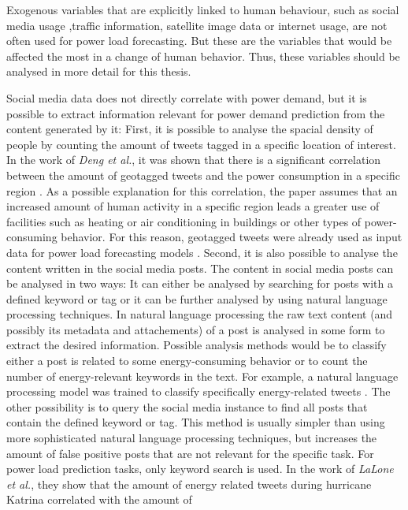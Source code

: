 Exogenous variables that are explicitly linked to human behaviour, 
such as social media usage ,traffic information,  
satellite image data or internet usage, are not often 
used for power load forecasting. 
But these are the variables that would be affected the most in a change of 
human behavior. Thus, these variables should be analysed in more detail 
for this thesis.

Social media data does not directly correlate with power demand, but it is
possible to extract information relevant for power demand prediction
from the content generated by it:
First, it is possible to analyse the spacial density of people by 
counting the amount of tweets tagged in a specific location of interest. 
In the work of \textit{Deng et al.},
it was shown that there is a significant
correlation between the amount of geotagged tweets
and the power consumption in a specific region \cite{twittergeoloccorr}.
As a possible explanation for this correlation, the paper assumes that 
an increased amount of human activity in a specific region leads a greater 
use of facilities such as heating or air conditioning in buildings or 
other types of power-consuming behavior.
For this reason, geotagged tweets were already used as input data for 
power load forecasting models 
\cite{twittergeolocforecasting} \cite{twittergeolocforecasting2}.
Second, it is also possible to analyse the content written in the 
social media posts. The content in social media posts can be 
analysed in two ways: 
It can either be analysed by searching for posts with a defined keyword or tag
or it can be further analysed by using natural language processing techniques. 
In natural language processing the raw text content 
(and possibly its metadata and attachements) of a post is analysed
in some form to extract the desired information. Possible analysis
methods would be to classify either a post is related to some energy-consuming
behavior or to count the number of energy-relevant keywords in the text.
For example, a natural language processing model was trained to 
classify specifically energy-related tweets \cite{energybert}.
The other possibility is to query the social media instance 
to find all posts that contain the defined keyword or tag.
This method is usually simpler than using more sophisticated natural 
language processing techniques, but increases the amount of false positive 
posts that are not relevant for the specific task.
For power load prediction tasks, only keyword search is used.
In the work of \textit{LaLone et al.}, they show that the amount of energy
related tweets during hurricane Katrina correlated with the amount of 
